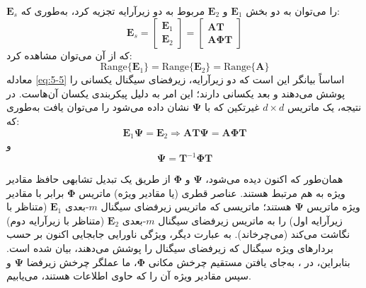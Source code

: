 $\bm{E}_s$ را می‌توان به دو بخش $\bm{E}_1$ و $\bm{E}_2$ مربوط به دو زیرآرایه تجزیه کرد، به‌طوری که:
\begin{equation}
	\bm{E}_s = \begin{bmatrix} \bm{E}_1 \\ \bm{E}_2 \end{bmatrix} = \begin{bmatrix} \bm{AT} \\ \bm{A\Phi T} \end{bmatrix}
	\label{eq:5-4}
\end{equation}
که از آن می‌توان مشاهده کرد:
\begin{equation}
	\text{Range}\{\bm{E}_1\} = \text{Range}\{\bm{E}_2\} = \text{Range}\{\bm{A}\}
	\label{eq:5-5}
\end{equation}
معادله \eqref{eq:5-5} اساساً بیانگر این است که دو زیرآرایه، زیرفضای سیگنال یکسانی را پوشش می‌دهند و بعد یکسانی دارند؛ این امر به دلیل پیکربندی یکسان آن‌هاست. در نتیجه، یک ماتریس $d \times d$ غیرتکین که با $\bm{\Psi}$ نشان داده می‌شود را می‌توان یافت به‌طوری که:
\begin{equation}
	\bm{E}_1 \bm{\Psi} = \bm{E}_2 \Rightarrow \bm{AT\Psi} = \bm{A\Phi T}
	\label{eq:5-6}
\end{equation}
و
\begin{equation}
	\bm{\Psi} = \bm{T}^{-1} \bm{\Phi} \bm{T}
	\label{eq:5-7}
\end{equation}

همان‌طور که اکنون دیده می‌شود، $\bm{\Psi}$ و $\bm{\Phi}$ از طریق یک تبدیل تشابهی حافظ مقادیر ویژه به هم مرتبط هستند. عناصر قطری (یا مقادیر ویژه) ماتریس $\bm{\Phi}$ برابر با مقادیر ویژه ماتریس $\bm{\Psi}$ هستند؛ ماتریسی که ماتریس زیرفضای سیگنال $m$-بعدی $\bm{E}_1$ (متناظر با زیرآرایه اول) را به ماتریس زیرفضای سیگنال $m$-بعدی $\bm{E}_2$ (متناظر با زیرآرایه دوم) نگاشت می‌کند (می‌چرخاند). به عبارت دیگر، ویژگی ناورایی جابجایی اکنون بر حسب بردارهای ویژه سیگنال که زیرفضای سیگنال را پوشش می‌دهند، بیان شده است. بنابراین، در ، به‌جای یافتن مستقیم چرخش مکانی $\bm{\Phi}$، ما عملگر چرخش زیرفضا $\bm{\Psi}$ و سپس مقادیر ویژه آن را که حاوی اطلاعات  هستند، می‌یابیم.



